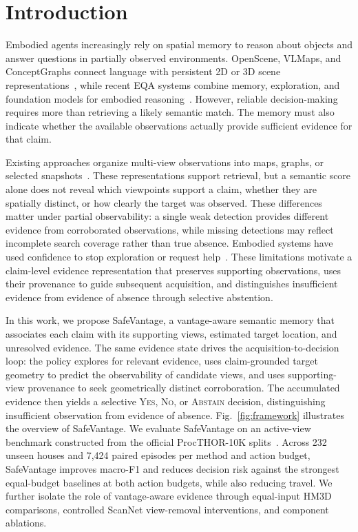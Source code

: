 \documentclass[letterpaper, 10 pt, conference]{ieeeconf}
\newcommand{\method}{SafeVantage}
\begin{document}
    
    \section{Introduction}
    
    Embodied agents increasingly rely on spatial memory to reason about
    objects and answer questions in partially observed environments.
    OpenScene, VLMaps, and ConceptGraphs connect language with persistent
    2D or 3D scene representations~\citep{peng2023openscene,
    huang2023vlmaps,gu2024conceptgraphs}, while recent EQA systems combine
    memory, exploration, and foundation models for embodied
    reasoning~\citep{das2018embodied,majumdar2024openeqa,exploreeqa2024}.
    However, reliable decision-making requires more than retrieving a likely
    semantic match. The memory must also indicate whether the available observations
    actually provide sufficient evidence for that claim.

    Existing approaches organize multi-view observations into maps, graphs, or selected snapshots~\citep{huang2023vlmaps,gu2024conceptgraphs,yang2024threedmem}. These representations support retrieval, but a semantic score alone does not reveal which viewpoints support a claim, whether they are spatially distinct, or how clearly the target was observed. These differences matter under partial observability: a single weak detection provides different evidence from corroborated observations, while missing detections may reflect incomplete search coverage rather than true absence. Embodied systems have used confidence to stop exploration or request help~\citep{geifman2019selectivenet,cheng2025efficienteqa}. These limitations motivate a claim-level evidence representation that preserves supporting observations, uses their provenance to guide subsequent acquisition, and distinguishes insufficient evidence from evidence of absence through selective abstention.

    In this work, we propose \method{}, a vantage-aware semantic memory that associates each claim with its supporting views, estimated target location, and unresolved evidence. The same evidence state drives the acquisition-to-decision loop: the policy explores for relevant evidence, uses claim-grounded target geometry to predict the observability of candidate views, and uses supporting-view provenance to seek geometrically distinct corroboration. The accumulated evidence then yields a selective \textsc{Yes}, \textsc{No}, or \textsc{Abstain} decision, distinguishing insufficient observation from evidence of absence. Fig.~\ref{fig:framework} illustrates the overview of \method{}.
    We evaluate \method{} on an active-view benchmark constructed from the official ProcTHOR-10K splits~\citep{deitke2022procthor}. Across 232 unseen houses and 7,424 paired episodes per method and action budget, \method{} improves macro-F1 and reduces decision risk against the strongest equal-budget baselines at both action budgets, while also reducing travel. We further isolate the role of vantage-aware evidence through equal-input HM3D comparisons, controlled ScanNet view-removal interventions, and component ablations.
    
\end{document}
